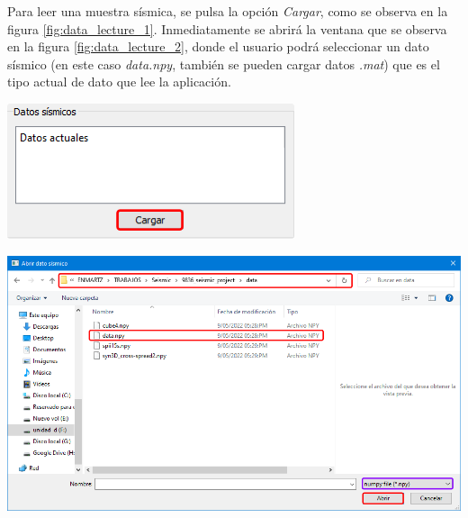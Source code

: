 \documentclass[12pt,oneside,a4]{article}
\newenvironment{Figure}
  {\par\medskip\noindent\minipage{\linewidth}}
  {\endminipage\par\medskip}
\begin{document}
\begin{multicols}{2}
Para leer una muestra sísmica, se pulsa la opción \emph{Cargar}, como se observa en la figura \ref{fig:data_lecture_1}. Inmediatamente se abrirá la ventana que se observa en la figura \ref{fig:data_lecture_2}, donde el usuario podrá seleccionar un dato sísmico (en este caso \emph{data.npy}, también se pueden cargar datos \emph{.mat}) que es el tipo actual de dato que lee la aplicación.

\begin{Figure}
    \centering
    \includegraphics[width=.7\linewidth]{data-lecture-1.png}
    \label{fig:data_lecture_1}
\end{Figure}

\end{multicols}

\begin{Figure}
    \centering
    \includegraphics[width=1\linewidth]{data-lecture-2.png}
    \label{fig:data_lecture_2}
\end{Figure}
\end{document}
